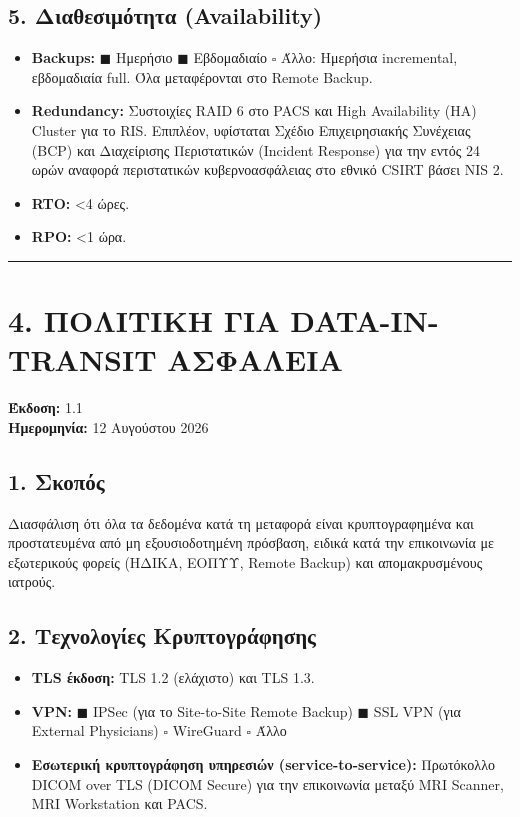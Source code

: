 \documentclass[11pt,a4paper]{article}
\begin{document}
\subsection*{5. Διαθεσιμότητα (Availability)}
\begin{itemize}
    \item \textbf{Backups:} $\blacksquare$ Ημερήσιο \quad $\blacksquare$ Εβδομαδιαίο \quad $\square$ Άλλο: Ημερήσια incremental, εβδομαδιαία full. Όλα μεταφέρονται στο Remote Backup.
    \item \textbf{Redundancy:} Συστοιχίες RAID 6 στο PACS και High Availability (HA) Cluster για το RIS. Επιπλέον, υφίσταται Σχέδιο Επιχειρησιακής Συνέχειας (BCP) και Διαχείρισης Περιστατικών (Incident Response) για την εντός 24 ωρών αναφορά περιστατικών κυβερνοασφάλειας στο εθνικό CSIRT βάσει NIS 2.
    \item \textbf{RTO:} \textless   4 ώρες.
    \item \textbf{RPO:} \textless 1 ώρα.
\end{itemize}

\vspace{1cm}
\hrule
\vspace{1cm}

\section*{4. ΠΟΛΙΤΙΚΗ ΓΙΑ DATA-IN-TRANSIT ΑΣΦΑΛΕΙΑ}
\textbf{Έκδοση:} 1.1\\
\textbf{Ημερομηνία:} 12 Αυγούστου 2026

\subsection*{1. Σκοπός}
Διασφάλιση ότι όλα τα δεδομένα κατά τη μεταφορά είναι κρυπτογραφημένα και προστατευμένα από μη εξουσιοδοτημένη πρόσβαση, ειδικά κατά την επικοινωνία με εξωτερικούς φορείς (ΗΔΙΚΑ, ΕΟΠΥΥ, Remote Backup) και απομακρυσμένους ιατρούς.

\subsection*{2. Τεχνολογίες Κρυπτογράφησης}
\begin{itemize}
    \item \textbf{TLS έκδοση:} TLS 1.2 (ελάχιστο) και TLS 1.3.
    \item \textbf{VPN:} $\blacksquare$ IPSec (για το Site-to-Site Remote Backup) \quad $\blacksquare$ SSL VPN (για External Physicians) \quad $\square$ WireGuard \quad $\square$ Άλλο
    \item \textbf{Εσωτερική κρυπτογράφηση υπηρεσιών (service-to-service):} Πρωτόκολλο DICOM over TLS (DICOM Secure) για την επικοινωνία μεταξύ MRI Scanner, MRI Workstation και PACS.
\end{itemize}
\end{document}

